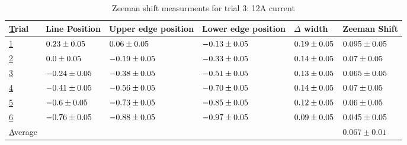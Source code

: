 \begin{table}
    \begin{adjustwidth}{-100pt}{-100pt}
        \centering
        \begin{tabular}{|l|l|l|l|l|l|}
            \hline
            {\ul Trial}   & Line Position                & Upper edge position          & Lower edge position          & $\Delta$ width              & Zeeman Shift                 \\ \hline
            {\ul 1}       & $0.23 \pm 0.05$  & $0.06 \pm 0.05$  & $-0.13 \pm 0.05$ & $0.19 \pm 0.05$ & $0.095 \pm 0.05$ \\ \hline
            {\ul 2}       & $0.0 \pm 0.05$   & $-0.19 \pm 0.05$ & $-0.33 \pm 0.05$ & $0.14 \pm 0.05$ & $0.07 \pm 0.05$  \\ \hline
            {\ul 3}       & $-0.24 \pm 0.05$ & $-0.38 \pm 0.05$ & $-0.51 \pm 0.05$ & $0.13 \pm 0.05$ & $0.065 \pm 0.05$ \\ \hline
            {\ul 4}       & $-0.41 \pm 0.05$ & $-0.56 \pm 0.05$ & $-0.70 \pm 0.05$ & $0.14 \pm 0.05$ & $0.07 \pm 0.05$  \\ \hline
            {\ul 5}       & $-0.6 \pm 0.05$  & $-0.73 \pm 0.05$ & $-0.85 \pm 0.05$ & $0.12 \pm 0.05$ & $0.06 \pm 0.05$  \\ \hline
            {\ul 6}       & $-0.76 \pm 0.05$ & $-0.88 \pm 0.05$ & $-0.97 \pm 0.05$ & $0.09 \pm 0.05$ & $0.045 \pm 0.05$ \\ \hline
            {\ul Average} &                              &                              &                              &                             & $0.067 \pm 0.01$             \\ \hline
        \end{tabular}
    \end{adjustwidth}

    \caption{Zeeman shift measurments for trial 3: 12A current}

\end{table}


